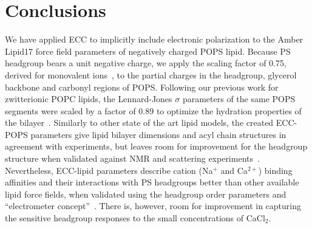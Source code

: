 \documentclass[journal=jpcbfk,manuscript=article]{achemso}
\begin{document}




\section{Conclusions} 
We have applied ECC to implicitly include electronic polarization to the Amber Lipid17 force field
parameters of negatively charged POPS lipid.
Because PS headgroup bears a unit negative charge, we apply the scaling factor of 0.75,
derived for monovalent ions~\cite{leontyev09}, to the partial charges
in the headgroup, glycerol backbone and carbonyl regions of POPS.
Following our previous work for zwitterionic POPC lipids, the 
Lennard-Jones $\sigma$ parameters of the same POPS segments were
scaled by a factor of 0.89 to optimize the hydration properties of the bilayer~\cite{melcr18}.
Similarly to other state of the art lipid models, the created ECC-POPS parameters give
lipid bilayer dimensions and acyl chain structures in agreement with experiments,
but leaves room for improvement for the headgroup structure when validated against
NMR and scattering experiments~\cite{botan15,ollila16}.
Nevertheless, ECC-lipid parameters describe cation (Na$^+$ and Ca$^{2+}$) binding affinities
and their interactions with PS headgroups better than other available lipid force fields,
when validated using the headgroup order parameters and ``electrometer concept''~\cite{NMRlipidsIV}.
There is, however, room for improvement in capturing the sensitive headgroup responses to the
small concentrations of CaCl$_2$.
\end{document}
